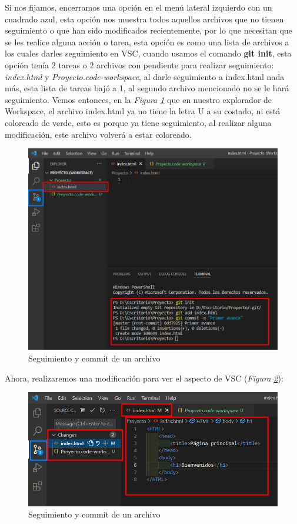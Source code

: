 Si nos fijamos, encerramos una opción en el menú lateral izquierdo con un cuadrado azul, esta opción nos muestra todos aquellos archivos que no tienen seguimiento o que han sido modificados recientemente, por lo que necesitan que se les realice alguna acción o tarea, esta opción es como una lista de archivos a los cuales darles seguimiento en VSC, cuando usamos el comando \textbf{git init}, esta opción tenía 2 tareas o 2 archivos con pendiente para realizar seguimiento: \textit{index.html} y \textit{Proyecto.code-workspace}, al darle seguimiento a index.html nada más, esta lista de tareas bajó a 1, al segundo archivo mencionado no se le hará seguimiento. Vemos entonces, en la \textit{Figura \ref{fig: 14}} que en nuestro explorador de Workspace, el archivo index.html ya no tiene la letra U a su costado, ni está coloreado de verde, esto es porque ya tiene seguimiento, al realizar alguna modificación, este archivo volverá a estar coloreado.
\begin{figure}[H]
    \centering
    \caption{Seguimiento y commit de un archivo}
    \label{fig: 14}
    \includegraphics[width=12cm]{capturas/git add git commit.png}
\end{figure}

Ahora, realizaremos una modificación para ver el aspecto de VSC (\textit{Figura \ref{fig: 15}}):
\begin{figure}[H]
    \centering
    \caption{Seguimiento y commit de un archivo}
    \label{fig: 15}
    \includegraphics[width=12cm]{capturas/modificaciones.png}
\end{figure}

